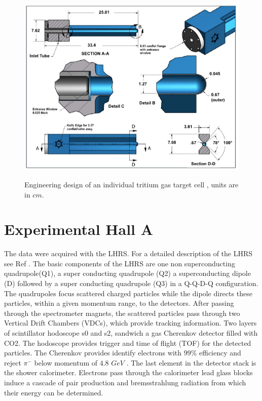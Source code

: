 \documentclass[final,5p,times,twocolumn]{elsarticle}
\begin{document}
\begin{figure}[!h]
\centering
  \includegraphics[width=13cm]{tritium_cell.jpg}\\
  \caption{Engineering design of an individual tritium gas target cell \cite{celldes}, units are in $cm$.
 }\label{cell}
\end{figure}


\section{Experimental Hall A}

The data were acquired with the LHRS. For a detailed description of the LHRS see Ref \cite{Alcorn:2004sb}. The basic components of the LHRS are one non superconducting quadrupole(Q1), a super conducting quadrupole (Q2) a superconducting dipole (D) followed by a super conducting quadrupole (Q3) in a Q-Q-D-Q configuration. The quadrupoles focus scattered charged particles while the dipole directs these particles, within a given momentum range, to the detectors. After passing through the spectrometer magnets, the scattered particles pass through two Vertical Drift Chambers (VDCs), which provide tracking information. Two layers of scintillator hodoscope s0 and s2, sandwich a gas Cherenkov detector filled with CO2. The hodoscope provides trigger and time of flight (TOF) for the detected particles. The Cherenkov provides identify electrons with $99 \%$  efficiency and reject $\pi^{-}$ below momentum of $4.8$ $GeV$ . The last element in the detector stack is the shower calorimeter. Electrons pass through the calorimeter lead glass blocks induce a cascade of pair production and bremsstrahlung radiation from which their energy can be determined\cite{Alcorn:2004sb}.
\end{document}
